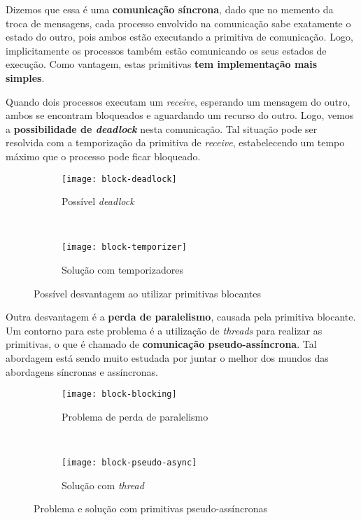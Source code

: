 Dizemos que essa é uma \textbf{comunicação síncrona}, dado que no memento da troca de mensagens, cada processo envolvido na comunicação sabe exatamente o estado do outro, pois ambos estão executando a primitiva de comunicação. Logo, implicitamente os processos também estão comunicando os seus estados de execução. Como vantagem, estas primitivas \textbf{tem implementação mais simples}.

Quando dois processos executam um \textit{receive}, esperando um mensagem do outro, ambos se encontram bloqueados e aguardando um recurso do outro. Logo, vemos a \textbf{possibilidade de \textit{deadlock}} nesta comunicação. Tal situação pode ser resolvida com a temporização da primitiva de \textit{receive}, estabelecendo um tempo máximo que o processo pode ficar bloqueado.

\begin{figure*}[ht]
  \begin{subfigure}[t]{0.5\textwidth}
    \centering
    \texttt{[image: block-deadlock]}
    \caption{Possível \textit{deadlock}}
    \label{subfig:block-deadlock}
  \end{subfigure}
  ~
  \begin{subfigure}[t]{0.5\textwidth}
    \centering
    \texttt{[image: block-temporizer]}
    \caption{Solução com temporizadores}
    \label{subfig:block-temporizer}
  \end{subfigure}

  \caption{Possível desvantagem ao utilizar primitivas blocantes}
  \label{fig:block-deadlock-scheme}
\end{figure*}

Outra desvantagem é a \textbf{perda de paralelismo}, causada pela primitiva blocante. Um contorno para este problema é a utilização de \textit{threads} para realizar as primitivas, o que é chamado de \textbf{comunicação pseudo-assíncrona}. Tal abordagem está sendo muito estudada por juntar o melhor dos mundos das abordagens síncronas e assíncronas.

\begin{figure*}[ht]
  \begin{subfigure}[t]{0.5\textwidth}
    \centering
    \texttt{[image: block-blocking]}
    \caption{Problema de perda de paralelismo}
    \label{subfig:block-pseudo-async1}
  \end{subfigure}
  ~
  \begin{subfigure}[t]{0.5\textwidth}
    \centering
    \texttt{[image: block-pseudo-async]}
    \caption{Solução com \textit{thread}}
    \label{subfig:block-pseudo-async2}
  \end{subfigure}

  \caption{Problema e solução com primitivas pseudo-assíncronas}
  \label{fig:block-pseudo-async}
\end{figure*}


